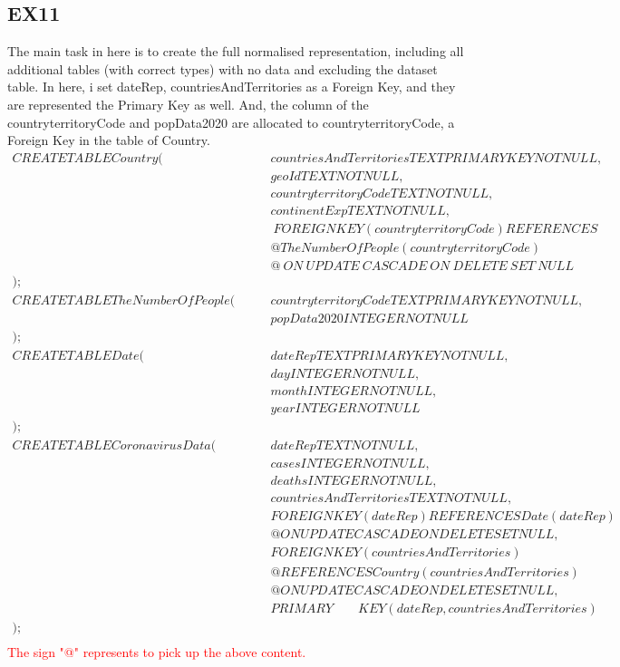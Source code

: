 \documentclass[]{article}
\begin{document}
\begin{titlepage}
		    \subsection{EX11}
		    The main task in here is to create the full normalised representation, including all additional tables (with correct types) with no data and excluding the dataset table.
		    In here, i set dateRep, countriesAndTerritories as a Foreign Key, and they are represented the Primary Key as well. And, the column of the countryterritoryCode and popData2020 are allocated to countryterritoryCode, a Foreign Key in the table of Country.
		    \newpage
		        \begin{align}
		    CREATE TABLE Country(\ &countriesAndTerritories TEXT PRIMARY KEY NOT NULL,\\&geoId TEXT NOT NULL,\\&countryterritoryCode TEXT NOT NULL,\\&continentExp TEXT NOT NULL,\\&\ FOREIGN KEY (countryterritoryCode) REFERENCES \\
		    &@TheNumberOfPeople(countryterritoryCode)\\ &@\ ON\ UPDATE\ CASCADE\ ON \ DELETE\ SET\ NULL\\);\\
		    CREATE TABLE TheNumberOfPeople(\qquad&countryterritoryCode TEXT PRIMARY KEY NOT NULL,\\&popData2020 INTEGER NOT NULL\\);\\
		    CREATE TABLE Date(\qquad&dateRep TEXT PRIMARY KEY NOT NULL,\\&day INTEGER NOT NULL,\\&month INTEGER NOT NULL,\\&year INTEGER NOT NULL\\);\\
            CREATE TABLE CoronavirusData(\qquad&dateRep TEXT NOT NULL,\\&cases INTEGER NOT NULL,\\&deaths INTEGER NOT NULL,\\&countriesAndTerritories TEXT NOT NULL,\\&FOREIGN KEY (dateRep) REFERENCES Date(dateRep)\\ &@ ON UPDATE CASCADE ON DELETE SET NULL,\\&FOREIGN KEY (countriesAndTerritories)\\ &@REFERENCES Country(countriesAndTerritories)\\ &@ON UPDATE CASCADE ON DELETE SET NULL,\\&PRIMARY\qquad KEY (dateRep, countriesAndTerritories)\\);\\
		        \end{align}
		\textcolor{red}{The sign "@" represents to pick up the above content.}

\end{titlepage}
\end{document}
